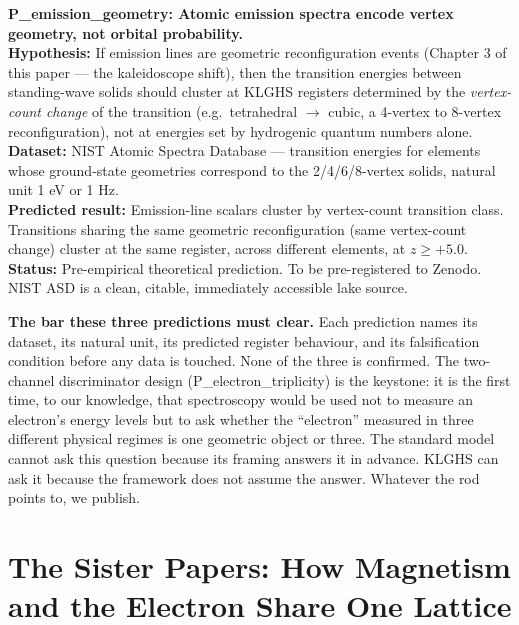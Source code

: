 \documentclass[11pt, letterpaper, openany]{book}
\begin{document}
\begin{predictionbox}
\textbf{P\_emission\_geometry: Atomic emission spectra encode vertex
geometry, not orbital probability.}\\[0.5em]
\textbf{Hypothesis:} If emission lines are geometric reconfiguration
events (Chapter 3 of this paper --- the kaleidoscope shift), then the
transition energies between standing-wave solids should cluster at KLGHS
registers determined by the \emph{vertex-count change} of the transition
(e.g.\ tetrahedral $\to$ cubic, a 4-vertex to 8-vertex reconfiguration),
not at energies set by hydrogenic quantum numbers alone.\\[0.5em]
\textbf{Dataset:} NIST Atomic Spectra Database --- transition energies for
elements whose ground-state geometries correspond to the 2/4/6/8-vertex
solids, natural unit 1 eV or 1 Hz.\\[0.5em]
\textbf{Predicted result:} Emission-line scalars cluster by vertex-count
transition class. Transitions sharing the same geometric reconfiguration
(same vertex-count change) cluster at the same register, across different
elements, at $z \geq +5.0$.\\[0.5em]
\textbf{Status:} Pre-empirical theoretical prediction. To be pre-registered
to Zenodo. NIST ASD is a clean, citable, immediately accessible lake
source.
\end{predictionbox}
 
\begin{warningbox}
\textbf{The bar these three predictions must clear.} Each prediction names
its dataset, its natural unit, its predicted register behaviour, and its
falsification condition before any data is touched. None of the three is
confirmed. The two-channel discriminator design (P\_electron\_triplicity)
is the keystone: it is the first time, to our knowledge, that spectroscopy
would be used not to measure an electron's energy levels but to ask whether
the ``electron'' measured in three different physical regimes is one
geometric object or three. The standard model cannot ask this question
because its framing answers it in advance. KLGHS can ask it because the
framework does not assume the answer. Whatever the rod points to, we
publish.
\end{warningbox}
 
\clearpage
 
\chapter{The Sister Papers: How Magnetism and the Electron Share One Lattice}
 
\end{document}
